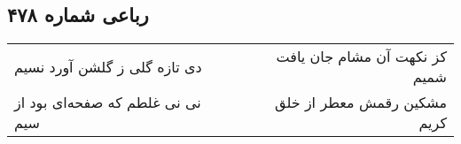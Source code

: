 \begin{center}
\section*{رباعی شماره ۴۷۸}
\label{sec:sh478}
\begin{longtable}{l p{0.5cm} r}
دی تازه گلی ز گلشن آورد نسیم
&&
کز نکهت آن مشام جان یافت شمیم
\\
نی نی غلطم که صفحه‌ای بود از سیم
&&
مشکین رقمش معطر از خلق کریم
\\
\end{longtable}
\end{center}
